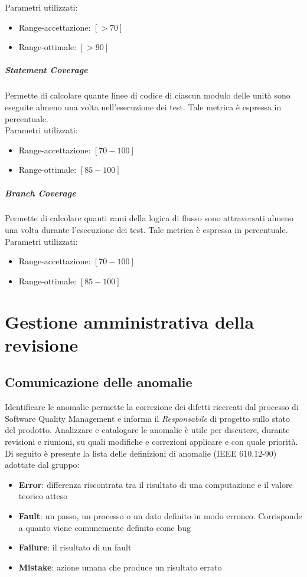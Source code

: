 {Parametri utilizzati:
\begin{itemize}
\item Range-accettazione: $[>70]$
\item Range-ottimale: $[>90]$\\
\end{itemize}



\subparagraph{Statement Coverage}
Permette di calcolare quante linee di codice di ciascun modulo delle unità sono eseguite almeno
una volta nell’esecuzione dei test. Tale metrica è espressa in percentuale.\\

Parametri utilizzati:
\begin{itemize}
\item Range-accettazione: $[70 - 100]$
\item Range-ottimale: $[85 - 100]$
\end{itemize}

\subparagraph{Branch Coverage}
Permette di calcolare quanti rami della logica di flusso sono attraversati almeno una volta durante
l’esecuzione dei test. Tale metrica è espressa in percentuale.\\

Parametri utilizzati:
\begin{itemize}
\item Range-accettazione: $[70 - 100]$
\item Range-ottimale: $[85 - 100]$
\end{itemize}




\section{Gestione amministrativa della revisione}

\subsection{Comunicazione delle anomalie}
Identificare le anomalie permette la correzione dei difetti ricercati
dal processo di Software Quality  Management e informa il  \emph{Responsabile} 
di  progetto sullo stato del prodotto. Analizzare e
catalogare le anomalie è utile per discutere, durante revisioni e
riunioni, su quali modifiche e correzioni applicare e con quale priorità. Di seguito è presente la lista delle definizioni di anomalie
(IEEE 610.12-90) adottate dal gruppo:
\begin{itemize}
\item \textbf{Error}: differenza riscontrata tra il risultato di una computazione e il valore teorico atteso
\item \textbf{Fault}: un passo, un processo o un dato definito in modo
  erroneo. Corrisponde a quanto viene comunemente definito come bug
\item \textbf{Failure}: il risultato di un fault
\item \textbf{Mistake}: azione umana che produce un risultato errato 
\end{itemize}


}

